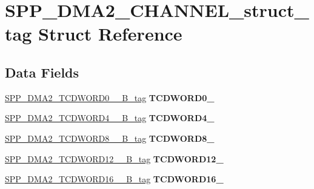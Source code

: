 \hypertarget{structSPP__DMA2__CHANNEL__struct__tag}{}\section{S\+P\+P\+\_\+\+D\+M\+A2\+\_\+\+C\+H\+A\+N\+N\+E\+L\+\_\+struct\+\_\+tag Struct Reference}
\label{structSPP__DMA2__CHANNEL__struct__tag}
\subsection*{Data Fields}
\begin{DoxyCompactItemize}
\item 
\mbox{\label{structSPP__DMA2__CHANNEL__struct__tag_a3ba01544c404756bd58916913b1268f9}} 
\mbox{\hyperlink{unionSPP__DMA2__TCDWORD0____32B__tag}{S\+P\+P\+\_\+\+D\+M\+A2\+\_\+\+T\+C\+D\+W\+O\+R\+D0\+\_\+\+\_\+B\+\_\+tag}} {\bfseries T\+C\+D\+W\+O\+R\+D0\+\_\+}
\item 
\mbox{\label{structSPP__DMA2__CHANNEL__struct__tag_a3c3d0813b2644ced325f95b9eef1c111}} 
\mbox{\hyperlink{unionSPP__DMA2__TCDWORD4____32B__tag}{S\+P\+P\+\_\+\+D\+M\+A2\+\_\+\+T\+C\+D\+W\+O\+R\+D4\+\_\+\+\_\+B\+\_\+tag}} {\bfseries T\+C\+D\+W\+O\+R\+D4\+\_\+}
\item 
\mbox{\label{structSPP__DMA2__CHANNEL__struct__tag_a8914c0a18c980ef2c02bf3f44af682b1}} 
\mbox{\hyperlink{unionSPP__DMA2__TCDWORD8____32B__tag}{S\+P\+P\+\_\+\+D\+M\+A2\+\_\+\+T\+C\+D\+W\+O\+R\+D8\+\_\+\+\_\+B\+\_\+tag}} {\bfseries T\+C\+D\+W\+O\+R\+D8\+\_\+}
\item 
\mbox{\label{structSPP__DMA2__CHANNEL__struct__tag_a4e628734a5abafcb22dc2ebffd87e77c}} 
\mbox{\hyperlink{unionSPP__DMA2__TCDWORD12____32B__tag}{S\+P\+P\+\_\+\+D\+M\+A2\+\_\+\+T\+C\+D\+W\+O\+R\+D12\+\_\+\+\_\+B\+\_\+tag}} {\bfseries T\+C\+D\+W\+O\+R\+D12\+\_\+}
\item 
\mbox{\label{structSPP__DMA2__CHANNEL__struct__tag_a61838b4c7eef429f55979b2a34ff9ca8}} 
\mbox{\hyperlink{unionSPP__DMA2__TCDWORD16____32B__tag}{S\+P\+P\+\_\+\+D\+M\+A2\+\_\+\+T\+C\+D\+W\+O\+R\+D16\+\_\+\+\_\+B\+\_\+tag}} {\bfseries T\+C\+D\+W\+O\+R\+D16\+\_\+}

\end{DoxyCompactItemize}
